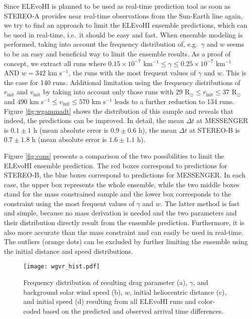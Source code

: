 \documentclass[draft]{agujournal}
\begin{document}
Since ELEvoHI is planned to be used as real-time prediction tool as soon as STEREO-A provides near real-time observations from the Sun-Earth line again, we try to find an approach to limit the ELEvoHI ensemble predictions, which can be used in real-time, i.e.\ it should be easy and fast.
When ensemble modeling is performed, taking into account the frequency distribution of, e.g.\ $\gamma$ and $w$ seems to be an easy and beneficial way to limit the ensemble results. As a proof of concept, we extract all runs where $0.15 \times 10^{-7}$ km$^{-1} \leq \gamma \leq 0.25 \times 10^{-7}$ km$^{-1}$ AND $w=342$ km s$^{-1}$, the runs with the most frequent values of $\gamma$ and $w$. This is the case for 140 runs. Additional limitation using the frequency distributions of $r_{\mathrm{init}}$ and $v_{\mathrm{init}}$ by taking into account only those runs with $29$ R$_\odot \leq r_{\mathrm{init}} \leq 37 $ R$_\odot$ and $490 $ km s$^{-1} \leq v_{\mathrm{init}} \leq 570 $ km s$^{-1}$ leads to a further reduction to 134 runs. Figure \ref{fig:wgammadt} shows the distribution of this sample and reveals that indeed, the predictions can be improved. In detail, the mean $\Delta t$ at MESSENGER is $0.1 \pm 1$ h (mean absolute error is $0.9 \pm 0.6$ h), the mean $\Delta t$ at STEREO-B is $0.7 \pm 1.8$ h (mean absolute error is $1.6 \pm 1.1$ h).

Figure \ref{fig:cons} presents a comparison of the two possibilities to limit the ELEvoHI ensemble prediction. The red boxes correspond to predictions for STEREO-B, the blue boxes correspond to predictions for MESSENGER. In each case, the upper box represents the whole ensemble, while the two middle boxes stand for the mass constrained sample and the lower box corresponds to the constraint using the most frequent values of $\gamma$ and $w$. The latter method is fast and simple, because no mass derivation is needed and the two parameters and their distribution directly result from the ensemble prediction. Furthermore, it is also more accurate than the mass constraint and can easily be used in real-time. The outliers (orange dots) can be excluded by further limiting the ensemble using the initial distance and speed distributions.


 \begin{figure}[h]
 \centering
 \texttt{[image: wgvr\_hist.pdf]}
 \caption{Frequency distribution of resulting drag parameter (a), $\gamma$, and background solar wind speed (b), $w$, initial heliocentric distance (c), and initial speed (d) resulting from all ELEvoHI runs and color-coded based on the predicted and observed arrival time differences.}
 \label{fig:gammaw}
 \end{figure}
\end{document}
